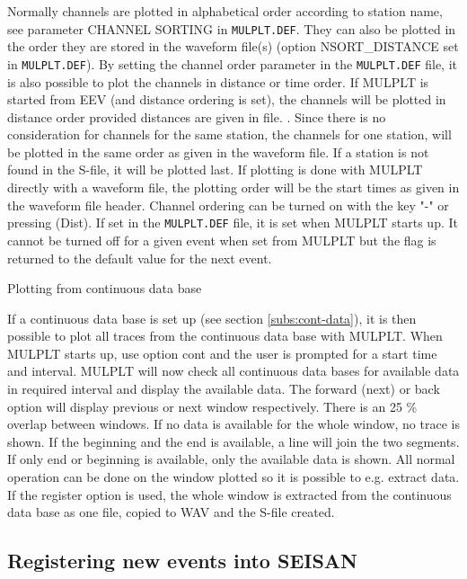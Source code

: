 Normally channels are plotted in alphabetical order according to station name, see parameter CHANNEL SORTING in \texttt{MULPLT.DEF}. They can also be plotted in the order they are stored in the waveform file(s) (option NSORT\_DISTANCE set in \texttt{MULPLT.DEF}). By setting the channel order parameter in the \texttt{MULPLT.DEF} file, it is also possible to plot the channels in distance or time order. If MULPLT is started from EEV (and distance ordering is set), the channels will be plotted 
in distance order provided distances are given in file. 
. 
Since there is no consideration for channels for the same station, the channels for one station, will be plotted in the same order as given in the waveform file. If a station is not found in the S-file, it will be plotted last. If plotting is done with MULPLT directly with a waveform file, the plotting order will be the start times as given in the waveform file header. Channel ordering can be turned on with the key "-" or pressing (Dist). If set in the \texttt{MULPLT.DEF} file, it 
is set when MULPLT starts up. It cannot be turned off for a given event when set from MULPLT but the flag is returned to the default value for the next event. 

Plotting from continuous data base 

If a continuous data base is set up (see section \ref{subs:cont-data}), it is then possible to plot all traces from the continuous data base with MULPLT. When MULPLT starts up, use option cont and the user is prompted for a start time and interval. MULPLT will now check all continuous data bases for available data in required interval and display the available data. The forward (next) or back option will display previous or next window respectively. There is an 25 \% overlap between windows. If no data is available for the whole window, no trace is shown. If the beginning and the end is available, a line will join the two segments. If only end or beginning is available, only the available data is shown. All normal operation can be done on the window plotted so it is possible to e.g. extract data. If the register option is used, the whole window is extracted from the continuous data base as one file, copied to WAV and the S-file created. 

\subsection{Registering new events into SEISAN}

